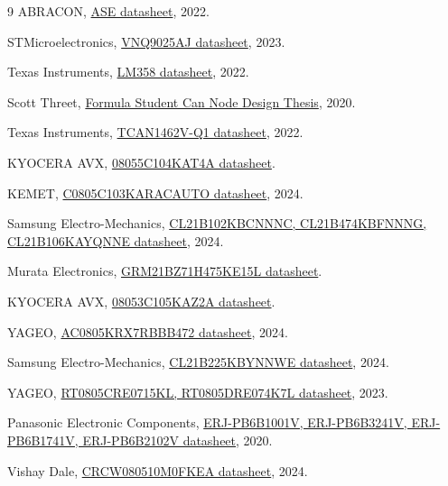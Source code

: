 \documentclass[10pt]{datasheet}
\begin{document}
\begin{thebibliography}{9}
ABRACON, \href{https://abracon.com/Oscillators/ASEseries.pdf}{ASE datasheet}, 2022.

STMicroelectronics, \href{https://www.st.com/resource/en/datasheet/vnq9025aj.pdf}{VNQ9025AJ datasheet}, 2023.

Texas Instruments, \href{https://www.ti.com/lit/ds/symlink/lm358.pdf}{LM358 datasheet}, 2022.

Scott Threet, \href{https://www.theseus.fi/bitstream/handle/10024/335005/THESIS.pdf?sequence=2&isAllowed=y}{Formula Student Can Node Design Thesis}, 2020.

Texas Instruments, \href{https://www.ti.com/lit/ds/symlink/tcan1462-q1.pdf}{TCAN1462V-Q1 datasheet}, 2022.

KYOCERA AVX, \href{https://datasheets.kyocera-avx.com/KGM_X7R.pdf}{08055C104KAT4A datasheet}.

KEMET, \href{https://content.kemet.com/datasheets/KEM_C1023_X7R_AUTO_SMD.pdf}{C0805C103KARACAUTO datasheet}, 2024.

Samsung Electro-Mechanics, \href{https://eu.mouser.com/datasheet/2/585/MLCC-1837944.pdf}{CL21B102KBCNNNC, CL21B474KBFNNNG, CL21B106KAYQNNE datasheet}, 2024.

Murata Electronics,
\href{https://search.murata.co.jp/Ceramy/image/img/A01X/G101/ENG/GRM21BZ71H475KE15-01.pdf}{GRM21BZ71H475KE15L datasheet}.

KYOCERA AVX, \href{https://datasheets.kyocera-avx.com/KGF.pdf}{08053C105KAZ2A datasheet}.

YAGEO, \href{https://www.yageo.com/upload/media/product/app/datasheet/mlcc/upy-ac_np0x7rx7s_6_3v-to-2kv.pdf}{AC0805KRX7RBBB472 datasheet}, 2024.

Samsung Electro-Mechanics, \href{https://eu.mouser.com/datasheet/2/585/Samsung_MLCC_1837944-1929650.pdf}{CL21B225KBYNNWE datasheet}, 2024.

YAGEO, \href{https://www.yageo.com/upload/media/product/app/datasheet/rchip/pyu-rt_1-to-0.01_rohs_l.pdf}{RT0805CRE0715KL, RT0805DRE074K7L datasheet}, 2023.

Panasonic Electronic Components, \href{https://industrial.panasonic.com/cdbs/www-data/pdf/RDM0000/AOA0000C328.pdf}{ERJ-PB6B1001V, ERJ-PB6B3241V, ERJ-PB6B1741V, ERJ-PB6B2102V datasheet}, 2020.

Vishay Dale, \href{https://www.vishay.com/docs/20035/dcrcwe3.pdf}{CRCW080510M0FKEA datasheet}, 2024.


\end{thebibliography}
\end{document}
